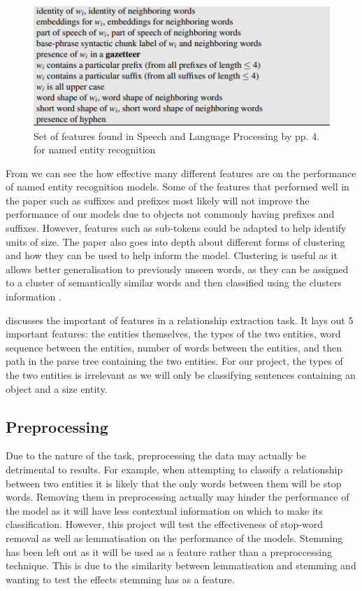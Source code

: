 \documentclass[11pt,oneside]{book}
\begin{document}
\begin{figure}[!htbp]
\centering
\includegraphics[scale=1]{figures/features.png}
\caption{Set of features found in Speech and Language Processing by \cite{reference1} pp. 4. for named entity recognition}
\label{fig:feature_set}
\end{figure}

From \citet{many_features} we can see the how effective many different features are on the performance of named entity recognition models. Some of the features that performed well in the paper such as suffixes and prefixes most likely will not improve the performance of our models due to objects not commonly having prefixes and suffixes. However, features such as sub-tokens could be adapted to help identify units of size. The paper also goes into depth about different forms of clustering and how they can be used to help inform the model. Clustering is useful as it allows better generalisation to previously unseen words, as they can be assigned to a cluster of semantically similar words and then classified using the clusters information \citep{phrasecluster}.

\citet{refeatures} discusses the important of features in a relationship extraction task. It lays out 5 important features: the entities themselves, the types of the two entities, word sequence between the entities, number of words between the entities, and then path in the parse tree containing the two entities. For our project, the types of the two entities is irrelevant as we will only be classifying sentences containing an object and a size entity.

\subsection{Preprocessing}
Due to the nature of the task, preprocessing the data may actually be detrimental to results. For example, when attempting to classify a relationship between two entities it is likely that the only words between them will be stop words. Removing them in preprocessing actually may hinder the performance of the model as it will have less contextual information on which to make its classification. However, this project will test the effectiveness of stop-word removal as well as lemmatisation on the performance of the models. Stemming has been left out as it will be used as a feature rather than a preproccessing technique. This is due to the similarity between lemmatisation and stemming and wanting to test the effects stemming has as a feature.
\end{document}
